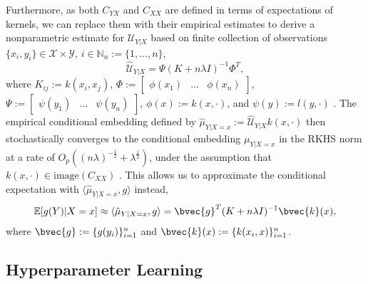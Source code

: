 \documentclass[twoside]{article}
\begin{document}
			Furthermore, as both $C_{YX}$ and $C_{XX}$ are defined in terms of expectations of kernels, we can replace them with their empirical estimates to derive a nonparametric estimate for $\mathcal{U}_{Y | X}$ based on finite collection of observations $\{x_{i}, y_{i}\} \in \mathcal{X} \times \mathcal{Y}$, $i \in \mathbb{N}_{n} := \{1, \dots, n\}$,
			\begin{equation}
			\hat{\mathcal{U}}_{Y | X} = \Psi (K + n \lambda I)^{-1} \Phi^{T},
			\label{eq:empirical_conditional_embedding}
			\end{equation}
			where $K_{ij} := k(x_{i}, x_{j})$, $\Phi := \begin{bmatrix} \phi(x_{1}) & \dots & \phi(x_{n}) \end{bmatrix}$, $\Psi := \begin{bmatrix} \psi(y_{1}) & \dots & \psi(y_{n}) \end{bmatrix}$, $\phi(x) := k(x, \cdot)$, and $\psi(y) := l(y, \cdot)$ \citep{song2013kernel}. The empirical conditional embedding defined by $\hat{\mu}_{Y | X = x} := \hat{\mathcal{U}}_{Y | X} k(x, \cdot)$ then stochastically converges to the conditional embedding $\mu_{Y | X = x}$ in the RKHS norm at a rate of $O_{p}((n \lambda)^{-\frac{1}{2}} + \lambda^{\frac{1}{2}})$, under the assumption that $k(x, \cdot) \in \mathrm{image}(C_{XX})$ \cite[Theorem 6]{song2009hilbert}. This allows us to approximate the conditional expectation with $\langle \hat{\mu}_{Y | X = x}, g \rangle$ instead, 
			\begin{equation}
			\mathbb{E}[g(Y) | X = x] \approx \langle \hat{\mu}_{Y | X = x}, g \rangle = \bvec{g}^{T} (K + n \lambda I)^{-1} \bvec{k}(x),
			\label{eq:empirical_conditional_expectation}
			\end{equation}
			where $\bvec{g} := \{g(y_{i})\}_{i = 1}^{n}$ and $\bvec{k}(x) := \{k(x_{i}, x)\}_{i = 1}^{n}$.
			
		\subsection{Hyperparameter Learning}
		
\end{document}
